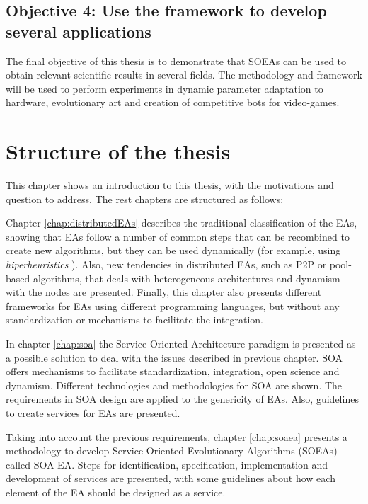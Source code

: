 \subsection*{Objective 4: Use the framework to develop several applications}
\label{subsec:intro:obj:applications}
The final objective of this thesis is to demonstrate that SOEAs can be used to obtain relevant scientific results in several fields. The methodology and framework will be used to perform experiments in dynamic parameter adaptation to hardware, evolutionary art and creation of competitive bots for video-games.



\section{Structure of the thesis}
\label{sec:intro:structure}

This chapter shows an introduction to this thesis, with the motivations and question to address. The rest chapters are structured as follows:

Chapter \ref{chap:distributedEAs} describes the traditional classification of the EAs, showing that EAs follow a number of common steps that can be recombined to create new algorithms, but they can be used dynamically (for example, using {\em hiperheuristics} \cite{cowling2001hyperheuristic}). Also, new tendencies in distributed EAs, such as P2P or pool-based algorithms, that deals with heterogeneous architectures and dynamism with the nodes are presented. Finally, this chapter also presents different frameworks for EAs using different programming languages, but without any standardization or mechanisms to facilitate the integration.

In chapter \ref{chap:soa} the Service Oriented Architecture paradigm is presented as a possible solution to deal with the issues described in previous chapter. SOA  offers mechanisms to facilitate standardization, integration, open science and dynamism. Different technologies and methodologies for SOA are shown. The requirements in SOA design are applied to the genericity of EAs. Also, guidelines to create services for EAs are presented.

Taking into account the previous requirements, chapter \ref{chap:soaea} presents a methodology to develop Service Oriented Evolutionary Algorithms (SOEAs) called SOA-EA. Steps for identification, specification, implementation and development of services are presented, with some guidelines about how each element of the EA should be designed as a service.

